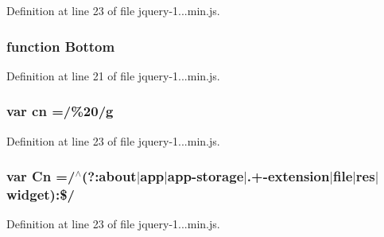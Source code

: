 Definition at line 23 of file jquery-\/1...\+min.\+js.

\hypertarget{_scripts_2jquery-1_810_82_8min_8js_aff76c1cba4a00c678dfce0e0c5a5538a}{}
\subsubsection[{Bottom}]{\setlength{\rightskip}{0pt plus 5cm}function Bottom}\label{_scripts_2jquery-1_810_82_8min_8js_aff76c1cba4a00c678dfce0e0c5a5538a}


Definition at line 21 of file jquery-\/1...\+min.\+js.

\hypertarget{_scripts_2jquery-1_810_82_8min_8js_a43c2bda2537661fb64e62fdfdcea1560}{}
\subsubsection[{cn}]{\setlength{\rightskip}{0pt plus 5cm}var cn =/\%20/{\bf g}}\label{_scripts_2jquery-1_810_82_8min_8js_a43c2bda2537661fb64e62fdfdcea1560}


Definition at line 23 of file jquery-\/1...\+min.\+js.

\hypertarget{_scripts_2jquery-1_810_82_8min_8js_ab832fcb3f80f807f0b65d1e3b4904de8}{}
\subsubsection[{Cn}]{\setlength{\rightskip}{0pt plus 5cm}var Cn =/$^\wedge$(?\+:about$\vert$app$\vert$app-\/storage$\vert$.+-\/extension$\vert$file$\vert$res$\vert$widget)\+:\$/}\label{_scripts_2jquery-1_810_82_8min_8js_ab832fcb3f80f807f0b65d1e3b4904de8}


Definition at line 23 of file jquery-\/1...\+min.\+js.

\hypertarget{_scripts_2jquery-1_810_82_8min_8js_ab5e3f3e2b2507b73e2d8092caa5c8650}{}
